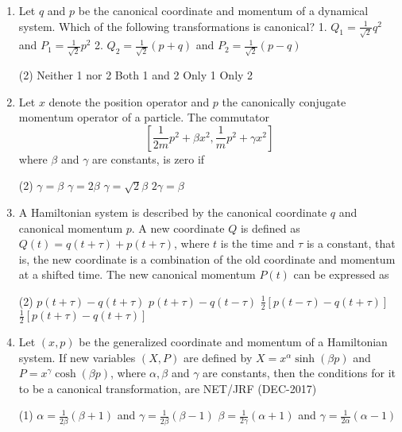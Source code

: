 \begin{enumerate}
	\item  Let $q$ and $p$ be the canonical coordinate and momentum of a dynamical system. Which of the following transformations is canonical?
	1. $Q_{1}=\frac{1}{\sqrt{2}} q^{2}$ and $P_{1}=\frac{1}{\sqrt{2}} p^{2}$
	2. $Q_{2}=\frac{1}{\sqrt{2}}(p+q)$ and $P_{2}=\frac{1}{\sqrt{2}}(p-q)$
	{}
	 \begin{tasks}(2)
		\task[\textbf{a.}]Neither 1 nor 2
		\task[\textbf{b.}]Both 1 and 2
		\task[\textbf{c.}]Only 1
		\task[\textbf{d.}] Only 2
	\end{tasks}
	\item  Let $x$ denote the position operator and $p$ the canonically conjugate momentum operator of a particle. The commutator
	$$
	\left[\frac{1}{2 m} p^{2}+\beta x^{2}, \frac{1}{m} p^{2}+\gamma x^{2}\right]
	$$
	where $\beta$ and $\gamma$ are constants, is zero if
	{}
	 \begin{tasks}(2)
		\task[\textbf{a.}]$\gamma=\beta$
		\task[\textbf{b.}]$\gamma=2 \beta$
		\task[\textbf{c.}]$\gamma=\sqrt{2} \beta$
		\task[\textbf{d.}] $2 \gamma=\beta$
	\end{tasks}
	\item  A Hamiltonian system is described by the canonical coordinate $q$ and canonical momentum $p$. A new coordinate $Q$ is defined as $Q(t)=q(t+\tau)+p(t+\tau)$, where $t$ is the time and $\tau$ is a constant, that is, the new coordinate is a combination of the old coordinate and momentum at a shifted time. The new canonical momentum $P(t)$ can be expressed as
{}
	 \begin{tasks}(2)
		\task[\textbf{a.}]$p(t+\tau)-q(t+\tau)$
		\task[\textbf{b.}]$p(t+\tau)-q(t-\tau)$
		\task[\textbf{c.}]$\frac{1}{2}[p(t-\tau)-q(t+\tau)]$
		\task[\textbf{d.}] $\frac{1}{2}[p(t+\tau)-q(t+\tau)]$
	\end{tasks}
	\item  Let $(x, p)$ be the generalized coordinate and momentum of a Hamiltonian system. If new variables $(X, P)$ are defined by $X=x^{\alpha} \sinh (\beta p)$ and $P=x^{\gamma} \cosh (\beta p)$, where $\alpha, \beta$ and $\gamma$ are constants, then the conditions for it to be a canonical transformation, are
	NET/JRF (DEC-2017)
	 \begin{tasks}(1)
		\task[\textbf{a.}]$\alpha=\frac{1}{2 \beta}(\beta+1)$ and $\gamma=\frac{1}{2 \beta}(\beta-1)$
		\task[\textbf{b.}]$\beta=\frac{1}{2 \gamma}(\alpha+1)$ and $\gamma=\frac{1}{2 \alpha}(\alpha-1)$

\end{tasks}
\end{enumerate}
